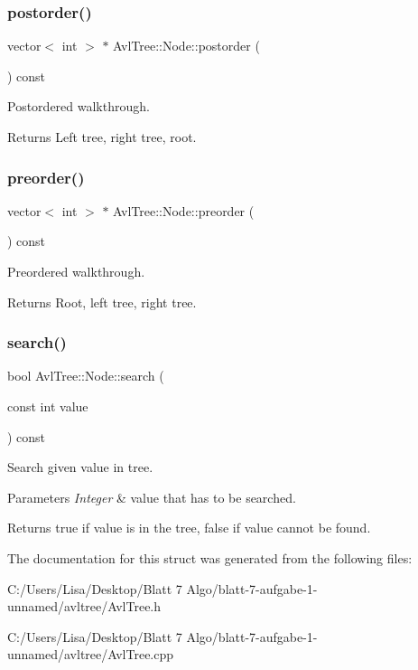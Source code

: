 \subsubsection{\texorpdfstring{postorder()}{postorder()}}
{\footnotesize\ttfamily vector$<$ int $>$ $\ast$ Avl\+Tree\+::\+Node\+::postorder (\begin{DoxyParamCaption}{ }\end{DoxyParamCaption}) const}

Postordered walkthrough. \begin{DoxyReturn}{Returns}
Left tree, right tree, root. 
\end{DoxyReturn}
\mbox{\label{struct_avl_tree_1_1_node_a32cdbc0d1dece3f4885bf9eed0643dc0}} 
\subsubsection{\texorpdfstring{preorder()}{preorder()}}
{\footnotesize\ttfamily vector$<$ int $>$ $\ast$ Avl\+Tree\+::\+Node\+::preorder (\begin{DoxyParamCaption}{ }\end{DoxyParamCaption}) const}

Preordered walkthrough. \begin{DoxyReturn}{Returns}
Root, left tree, right tree. 
\end{DoxyReturn}
\mbox{\label{struct_avl_tree_1_1_node_a9e6723c6082511451be1b87284201921}} 
\subsubsection{\texorpdfstring{search()}{search()}}
{\footnotesize\ttfamily bool Avl\+Tree\+::\+Node\+::search (\begin{DoxyParamCaption}\item[{const int}]{value }\end{DoxyParamCaption}) const}

Search given value in tree. 
\begin{DoxyParams}{Parameters}
{\em Integer} & value that has to be searched. \\
\hline
\end{DoxyParams}
\begin{DoxyReturn}{Returns}
true if value is in the tree, false if value cannot be found. 
\end{DoxyReturn}


The documentation for this struct was generated from the following files\+:\begin{DoxyCompactItemize}
\item 
C\+:/\+Users/\+Lisa/\+Desktop/\+Blatt 7 Algo/blatt-\/7-\/aufgabe-\/1-\/unnamed/avltree/Avl\+Tree.\+h\item 
C\+:/\+Users/\+Lisa/\+Desktop/\+Blatt 7 Algo/blatt-\/7-\/aufgabe-\/1-\/unnamed/avltree/Avl\+Tree.\+cpp\end{DoxyCompactItemize}
